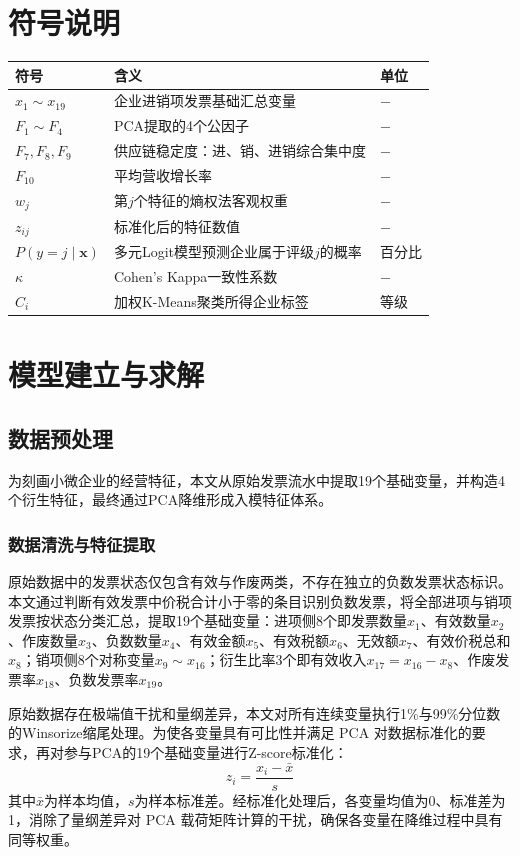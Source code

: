 \documentclass[12pt,a4paper,AutoFakeBold=2]{ctexart}
\newenvironment{symboltable}
  {\begin{center}\zihao{5}\begin{tabular}{>{\centering\arraybackslash}p{3.5cm} >{\centering\arraybackslash}p{7.5cm} >{\centering\arraybackslash}p{1.5cm}}
  \toprule
  \textbf{符号} & \textbf{含义} & \textbf{单位} \\
  \midrule}
  {\bottomrule\end{tabular}\end{center}}
\begin{document}
\section{符号说明}

\begin{symboltable}
$x_1 \sim x_{19}$ & 企业进销项发票基础汇总变量 & $-$ \\
$F_1 \sim F_4$ & PCA提取的4个公因子 & $-$ \\
$F_7, F_8, F_9$ & 供应链稳定度：进、销、进销综合集中度 & $-$ \\
$F_{10}$ & 平均营收增长率 & $-$ \\
$w_j$ & 第$j$个特征的熵权法客观权重 & $-$ \\
$z_{ij}$ & 标准化后的特征数值 & $-$ \\
$P(y=j \mid \mathbf{x})$ & 多元Logit模型预测企业属于评级$j$的概率 & 百分比 \\
$\kappa$ & Cohen's Kappa一致性系数 & $-$ \\
$C_i$ & 加权K-Means聚类所得企业标签 & 等级 \\
\end{symboltable}


\section{模型建立与求解}

\subsection{数据预处理}

为刻画小微企业的经营特征，本文从原始发票流水中提取19个基础变量，并构造4个衍生特征，最终通过PCA降维形成入模特征体系。

\subsubsection{数据清洗与特征提取}

原始数据中的发票状态仅包含有效与作废两类，不存在独立的负数发票状态标识。本文通过判断有效发票中价税合计小于零的条目识别负数发票，将全部进项与销项发票按状态分类汇总，提取19个基础变量：进项侧8个即发票数量$x_1$、有效数量$x_2$、作废数量$x_3$、负数数量$x_4$、有效金额$x_5$、有效税额$x_6$、无效额$x_7$、有效价税总和$x_8$；销项侧8个对称变量$x_9 \sim x_{16}$；衍生比率3个即有效收入$x_{17}=x_{16}-x_8$、作废发票率$x_{18}$、负数发票率$x_{19}$。

原始数据存在极端值干扰和量纲差异，本文对所有连续变量执行1\%与99\%分位数的Winsorize缩尾处理。为使各变量具有可比性并满足 PCA 对数据标准化的要求，再对参与PCA的19个基础变量进行Z-score标准化：
\begin{equation}
z_i = \frac{x_i - \bar{x}}{s}
\label{eq:zscore}
\end{equation}
其中$\bar{x}$为样本均值，$s$为样本标准差。经标准化处理后，各变量均值为0、标准差为1，消除了量纲差异对 PCA 载荷矩阵计算的干扰，确保各变量在降维过程中具有同等权重。
\end{document}
